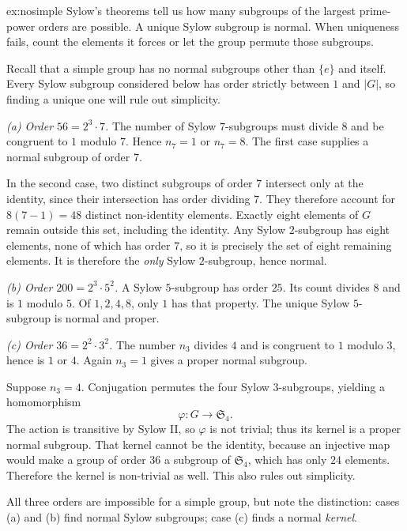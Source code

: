 \begin{solution}{ex:nosimple}
\idea Sylow's theorems tell us how many subgroups of the largest prime-power orders are possible. A unique Sylow subgroup is normal. When uniqueness fails, count the elements it forces or let the group permute those subgroups.

\writeup Recall that a simple group has no normal subgroups other than $\{e\}$ and itself. Every Sylow subgroup considered below has order strictly between $1$ and $|G|$, so finding a unique one will rule out simplicity.

\emph{(a) Order $56=2^3\cdot7$.} The number of Sylow $7$-subgroups must divide $8$ and be congruent to $1$ modulo $7$. Hence $n_7=1$ or $n_7=8$. The first case supplies a normal subgroup of order $7$.

In the second case, two distinct subgroups of order $7$ intersect only at the identity, since their intersection has order dividing $7$. They therefore account for $8(7-1)=48$ distinct non-identity elements. Exactly eight elements of $G$ remain outside this set, including the identity. Any Sylow $2$-subgroup has eight elements, none of which has order $7$, so it is precisely the set of eight remaining elements. It is therefore the \emph{only} Sylow $2$-subgroup, hence normal.

\emph{(b) Order $200=2^3\cdot5^2$.} A Sylow $5$-subgroup has order $25$. Its count divides $8$ and is $1$ modulo $5$. Of $1,2,4,8$, only $1$ has that property. The unique Sylow $5$-subgroup is normal and proper.

\emph{(c) Order $36=2^2\cdot3^2$.} The number $n_3$ divides $4$ and is congruent to $1$ modulo $3$, hence is $1$ or $4$. Again $n_3=1$ gives a proper normal subgroup.

Suppose $n_3=4$. Conjugation permutes the four Sylow $3$-subgroups, yielding a homomorphism
\[
\varphi:G\longrightarrow\mathfrak S_4.
\]
The action is transitive by Sylow II, so $\varphi$ is not trivial; thus its kernel is a proper normal subgroup. That kernel cannot be the identity, because an injective map would make a group of order $36$ a subgroup of $\mathfrak S_4$, which has only $24$ elements. Therefore the kernel is non-trivial as well. This also rules out simplicity.

All three orders are impossible for a simple group, but note the distinction: cases (a) and (b) find normal Sylow subgroups; case (c) finds a normal \emph{kernel}.
\end{solution}

